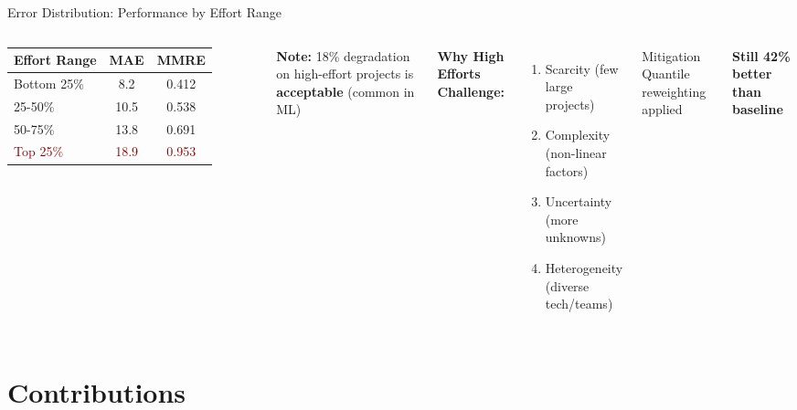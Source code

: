\documentclass[aspectratio=169]{beamer}
\begin{document}
\begin{frame}{Error Distribution: Performance by Effort Range}
\begin{columns}[T]
\begin{table}
\small
\begin{tabular}{lcc}
\toprule
\textbf{Effort Range} & \textbf{MAE} & \textbf{MMRE} \\
\midrule
Bottom 25\% & 8.2 & 0.412 \\
25-50\% & 10.5 & 0.538 \\
50-75\% & 13.8 & 0.691 \\
\textcolor{darkred}{Top 25\%} & \textcolor{darkred}{18.9} & \textcolor{darkred}{0.953} \\
\bottomrule
\end{tabular}
\end{table}

\vspace{0.3cm}
\textbf{Note:} 18\% degradation on high-effort projects is \textbf{acceptable} (common in ML)

\textbf{Why High Efforts Challenge:}
\begin{enumerate}
    \item Scarcity (few large projects)
    \item Complexity (non-linear factors)
    \item Uncertainty (more unknowns)
    \item Heterogeneity (diverse tech/teams)
\end{enumerate}

\vspace{0.3cm}
\begin{exampleblock}{Mitigation}
Quantile reweighting applied
\end{exampleblock}

\textbf{Still 42\% better than baseline}
\end{columns}
\end{frame}

\section{Contributions}
\end{document}
